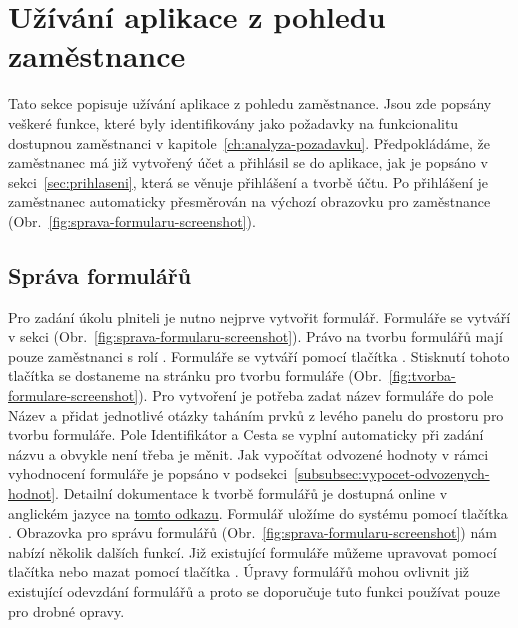 \section{Užívání aplikace z pohledu zaměstnance}\label{sec:uzivani-aplikace-z-pohledu-zamestnance}

Tato sekce popisuje užívání aplikace z pohledu zaměstnance.
Jsou zde popsány veškeré funkce, které byly identifikovány jako požadavky na funkcionalitu dostupnou zaměstnanci v kapitole~\ref{ch:analyza-pozadavku}.
Předpokládáme, že zaměstnanec má již vytvořený účet a přihlásil se do aplikace, jak je popsáno v sekci~\ref{sec:prihlaseni}, která se věnuje přihlášení a tvorbě účtu.
Po přihlášení je zaměstnanec automaticky přesměrován na výchozí obrazovku pro zaměstnance (Obr.~\ref{fig:sprava-formularu-screenshot}).

\subsection{Správa formulářů}\label{subsec:sprava-formularu}

Pro zadání úkolu plniteli je nutno nejprve vytvořit formulář.
Formuláře se vytváří v sekci  (Obr.~\ref{fig:sprava-formularu-screenshot}).
Právo na tvorbu formulářů mají pouze zaměstnanci s rolí .
Formuláře se vytváří pomocí tlačítka .
Stisknutí tohoto tlačítka se dostaneme na stránku pro tvorbu formuláře (Obr.~\ref{fig:tvorba-formulare-screenshot}).
Pro vytvoření je potřeba zadat název formuláře do pole Název a přidat jednotlivé otázky taháním prvků z levého panelu do prostoru pro tvorbu formuláře.
Pole Identifikátor a Cesta se vyplní automaticky při zadání názvu a obvykle není třeba je měnit.
Jak vypočítat odvozené hodnoty v rámci vyhodnocení formuláře je popsáno v podsekci~\ref{subsubsec:vypocet-odvozenych-hodnot}.
Detailní dokumentace k tvorbě formulářů je dostupná online v anglickém jazyce na \href{https://help.form.io/userguide/form-building}{tomto odkazu}.
Formulář uložíme do systému pomocí tlačítka .
Obrazovka pro správu formulářů (Obr.~\ref{fig:sprava-formularu-screenshot}) nám nabízí několik dalších funkcí.
Již existující formuláře můžeme upravovat pomocí tlačítka  nebo mazat pomocí tlačítka .
Úpravy formulářů mohou ovlivnit již existující odevzdání formulářů a proto se doporučuje tuto funkci používat pouze pro drobné opravy.

